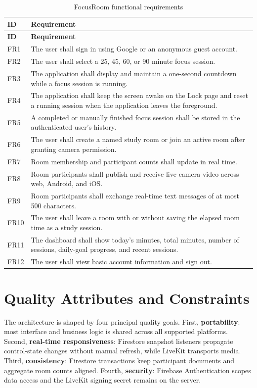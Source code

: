 \begin{longtable}{|p{}|p{}|}
\caption{FocusRoom functional requirements}\label{tab:functional_requirements}\\
\hline
\textbf{ID} & \textbf{Requirement} \\ \hline
\endfirsthead
\hline \textbf{ID} & \textbf{Requirement} \\ \hline
\endhead
FR1 & The user shall sign in using Google or an anonymous guest account. \\ \hline
FR2 & The user shall select a 25, 45, 60, or 90 minute focus session. \\ \hline
FR3 & The application shall display and maintain a one-second countdown while a focus session is running. \\ \hline
FR4 & The application shall keep the screen awake on the Lock page and reset a running session when the application leaves the foreground. \\ \hline
FR5 & A completed or manually finished focus session shall be stored in the authenticated user's history. \\ \hline
FR6 & The user shall create a named study room or join an active room after granting camera permission. \\ \hline
FR7 & Room membership and participant counts shall update in real time. \\ \hline
FR8 & Room participants shall publish and receive live camera video across web, Android, and iOS. \\ \hline
FR9 & Room participants shall exchange real-time text messages of at most 500 characters. \\ \hline
FR10 & The user shall leave a room with or without saving the elapsed room time as a study session. \\ \hline
FR11 & The dashboard shall show today's minutes, total minutes, number of sessions, daily-goal progress, and recent sessions. \\ \hline
FR12 & The user shall view basic account information and sign out. \\ \hline
\end{longtable}

\section{Quality Attributes and Constraints}
The architecture is shaped by four principal quality goals. First, \textbf{portability}: most interface and business logic is shared across all supported platforms. Second, \textbf{real-time responsiveness}: Firestore snapshot listeners propagate control-state changes without manual refresh, while LiveKit transports media. Third, \textbf{consistency}: Firestore transactions keep participant documents and aggregate room counts aligned. Fourth, \textbf{security}: Firebase Authentication scopes data access and the LiveKit signing secret remains on the server.

